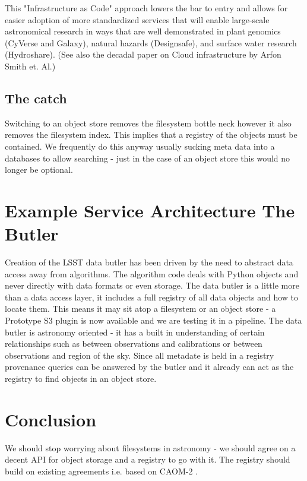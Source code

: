This "Infrastructure as Code" \citep{morris2016infrastructure} approach lowers the bar to entry
and allows for easier adoption of more standardized services that will enable large-scale
astronomical research in ways that are well demonstrated in plant genomics (CyVerse and Galaxy), natural hazards (Designsafe), and surface water research (Hydroshare). (See also the decadal paper on Cloud infrastructure by Arfon Smith et. Al.)

\subsection{The catch }
Switching to an object store removes the filesystem bottle neck however it also removes the filesystem index. This implies that a registry of the objects must be contained. We frequently do this anyway usually sucking meta data into a databases to allow searching - just in the case of an object store this would no longer be  optional.

\section{Example Service Architecture The Butler}
Creation of the LSST data butler \citep{2018arXiv181208085J} has been driven by the need to abstract data access away from algorithms.
The algorithm code deals with Python objects and never directly with data formats or even storage. The data butler is a little more than a data access layer, it includes a full registry of all data objects and how to locate them. This means it may sit atop a filesystem or an object store - a Prototype S3 plugin is now available and we are testing it in a pipeline.  The data butler is astronomy oriented - it has a built in understanding of certain relationships such as between observations and calibrations or between observations and region of the sky. Since all metadate is held in a registry provenance queries can be answered by the butler and it already can act as the registry to find objects in an object store.

\section{Conclusion}
We should stop worrying about filesystems in astronomy - we should agree on a decent API for object storage and a registry to go with it.
The registry should build on existing agreements i.e. based on CAOM-2 \citep{2007ASPC..376..347D}.
